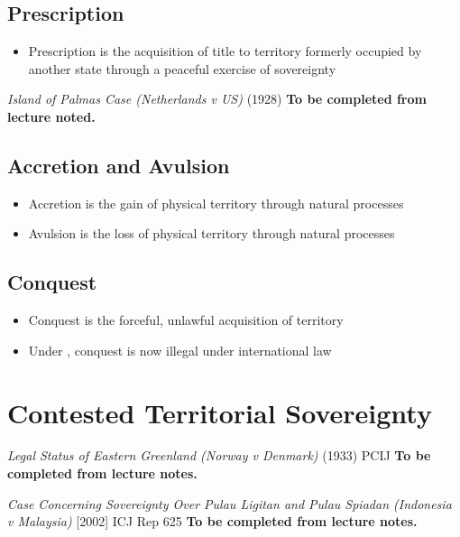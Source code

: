 \subsection{Prescription}
\begin{itemize}
    \item Prescription is the acquisition of title to territory formerly occupied by another state through a peaceful exercise of sovereignty
\end{itemize}

\begin{casedetails}{\textit{Island of Palmas Case (Netherlands v US)} (1928)}
    \flushleft
    \textbf{To be completed from lecture noted.}
\end{casedetails}

\subsection{Accretion and Avulsion}
\begin{itemize}
    \item Accretion is the gain of physical territory through natural processes
    \item Avulsion is the loss of physical territory through natural processes
\end{itemize}

\subsection{Conquest}
\begin{itemize}
    \item Conquest is the forceful, unlawful acquisition of territory
    \item Under , conquest is now illegal under international law
\end{itemize}

\section{Contested Territorial Sovereignty}
\begin{casedetails}{\textit{Legal Status of Eastern Greenland (Norway v Denmark)} (1933) PCIJ}
    \flushleft
    \textbf{To be completed from lecture notes.}
\end{casedetails}

\begin{casedetails}{\textit{Case Concerning Sovereignty Over Pulau Ligitan and Pulau Spiadan (Indonesia v Malaysia)} [2002] ICJ Rep 625}
    \flushleft
    \textbf{To be completed from lecture notes.}
\end{casedetails}

